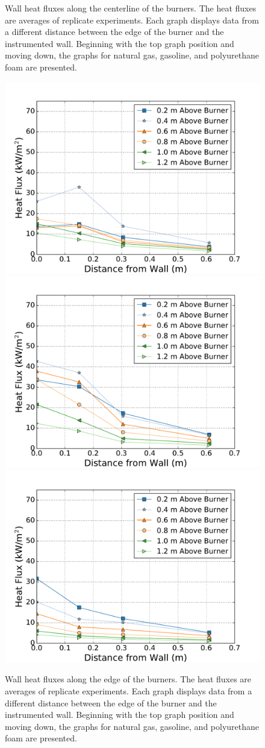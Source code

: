 \documentclass[twoside]{uocthesis}
\begin{document}
{\begin{figure}[p]
	\caption[Wall heat flux along the centerline of the burners]{Wall heat fluxes along the centerline of the burners.  The heat fluxes are averages of replicate experiments. Each graph displays data from a different distance between the edge of the burner and the instrumented wall.  Beginning with the top graph position and moving down, the graphs for natural gas, gasoline, and polyurethane foam are presented.}
	\label{NCTW_HF_Center_Comp}
\end{figure}

\begin{figure}[p]
	\centering
	\includegraphics[width=.6\columnwidth]{../Figures/NCTW_NG_HF_Offset_Avg} \\
	\includegraphics[width=.6\columnwidth]{../Figures/NCTW_GAS_HF_Offset_Avg}\\
	\includegraphics[width=.6\columnwidth]{../Figures/NCTW_PUF_HF_Offset_Avg} \\
	\caption[Wall heat flux along the edge of the burners]{Wall heat fluxes along the edge of the burners.  The heat fluxes are averages of replicate experiments. Each graph displays data from a different distance between the edge of the burner and the instrumented wall.  Beginning with the top graph position and moving down, the graphs for natural gas, gasoline, and polyurethane foam are presented.}
	\label{NCTW_HF_Edge_Comp}
\end{figure}

}
\end{document}
